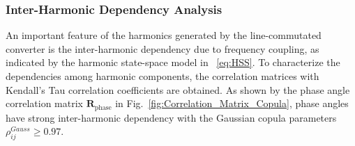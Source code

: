 \subsubsection{Inter-Harmonic Dependency Analysis}
An important feature of the harmonics generated by the line-commutated converter is the inter-harmonic dependency due to frequency coupling, as indicated by the harmonic state-space model in ~\eqref{eq:HSS}. To characterize the dependencies among harmonic components, the correlation matrices with Kendall's Tau correlation coefficients are obtained.
As shown by the phase angle correlation matrix $\mathbf{R}_{\text{phase}}$ in Fig.~\ref{fig:Correlation_Matrix_Copula}, phase angles have strong inter-harmonic dependency with the Gaussian copula parameters $\rho_{ij}^{Gauss} \geq 0.97$.


